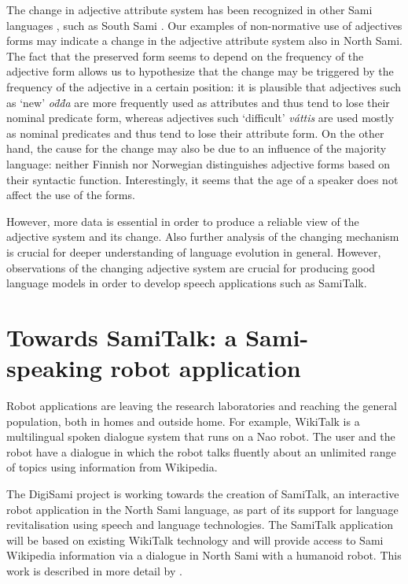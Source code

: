 \documentclass[runningheads,a4paper]{llncs}
\newcommand{\dbar}{\mbox{d\hspace{-.35em}\={}}}
\begin{document}
The change in adjective attribute system has been recognized in other Sami languages \cite{Riessler:06}, such as South Sami \cite{Bergsland:94}. Our examples of non-normative use of adjectives forms may indicate a change in the adjective attribute system also in North Sami. The fact that the preserved form seems to depend on the frequency of the adjective form allows us to hypothesize that the change may be triggered by the frequency of the adjective in a certain position: it is plausible that adjectives such as `new'
\textit{o{\dbar}{\dbar}a} are more frequently used as attributes and thus tend to lose their nominal predicate form, whereas adjectives such `difficult' \textit{v\'attis} are used mostly as nominal predicates and thus tend to lose their attribute form. On the other hand, the cause for the change may also be due to an influence of the majority language: neither Finnish nor Norwegian distinguishes adjective forms based on their syntactic function.
Interestingly, it seems that the age of a speaker does not affect the use of the forms.

However, more data is essential in order to produce a reliable view of the adjective system and its change. Also further analysis of the changing mechanism is crucial for deeper understanding of language evolution in general. However, observations of the changing adjective system are crucial for producing good language models in order to develop speech applications such as SamiTalk.

\section{Towards SamiTalk: a Sami-speaking robot application}
\label{sec:samitalk}

Robot applications are leaving the research laboratories and reaching the general population,
both in homes and outside home. For example, WikiTalk \cite{Wilcock:QACD:12,Jokinen:Wilcock:IWSDS:12} is a multilingual spoken dialogue system that runs on a Nao robot.
The user and the robot have a dialogue in which the robot talks fluently about an unlimited range of topics using information from Wikipedia.

The DigiSami project is working towards the creation of SamiTalk, an interactive robot application in the North Sami language, as part of its support for language revitalisation using speech and language technologies.
The SamiTalk application will be based on existing WikiTalk technology
and will provide access to Sami Wikipedia information via a dialogue in North Sami with a humanoid robot.
This work is described in more detail by \cite{Wilcock:ea:IWSDS:16}.
\end{document}
